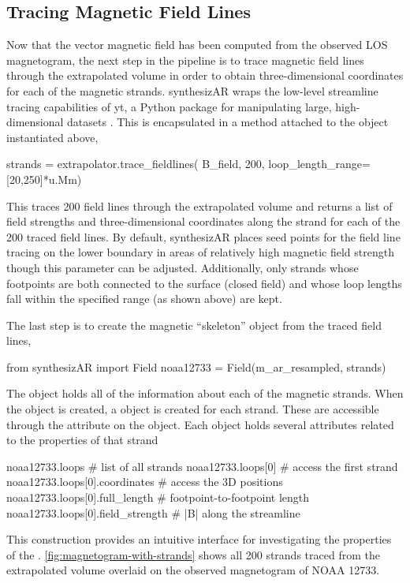 \subsection{Tracing Magnetic Field Lines}\label{sec:trace-fieldlines}

Now that the vector magnetic field has been computed from the observed LOS magnetogram, the next step in the pipeline is to trace magnetic field lines through the extrapolated volume in order to obtain three-dimensional coordinates for each of the magnetic strands. synthesizAR wraps the low-level streamline tracing capabilities of yt, a Python package for manipulating large, high-dimensional datasets \citep{turk_yt_2011}. This is encapsulated in a method attached to the  object instantiated above,
\begin{pyblock}[chapter4][baselinestretch=1,xleftmargin=3em]
strands = extrapolator.trace_fieldlines(
    B_field, 200, loop_length_range=[20,250]*u.Mm)
\end{pyblock}
This traces 200 field lines through the extrapolated volume and returns a list of field strengths and three-dimensional coordinates along the strand for each of the 200 traced field lines. By default, synthesizAR places seed points for the field line tracing on the lower boundary in areas of relatively high magnetic field strength though this parameter can be adjusted. Additionally, only strands whose footpoints are both connected to the surface (closed field) and whose loop lengths fall within the specified range (as shown above) are kept.

The last step is to create the magnetic ``skeleton'' object from the traced field lines,
\begin{pyblock}[chapter4][baselinestretch=1,xleftmargin=3em]
from synthesizAR import Field
noaa12733 = Field(m_ar_resampled, strands)
\end{pyblock}
The  object holds all of the information about each of the magnetic strands. When the  object is created, a  object is created for each strand. These are accessible through the  attribute on the  object. Each  object holds several attributes related to the properties of that strand
\begin{pyblock}[chapter4][baselinestretch=1,xleftmargin=3em]
noaa12733.loops  # list of all strands
noaa12733.loops[0]  # access the first strand
noaa12733.loops[0].coordinates  # access the 3D positions
noaa12733.loops[0].full_length  # footpoint-to-footpoint length
noaa12733.loops[0].field_strength  # |B| along the streamline
\end{pyblock}
This construction provides an intuitive interface for investigating the properties of the \AR{}. \autoref{fig:magnetogram-with-strands} shows all 200 strands traced from the extrapolated volume overlaid on the observed magnetogram of NOAA 12733. 

